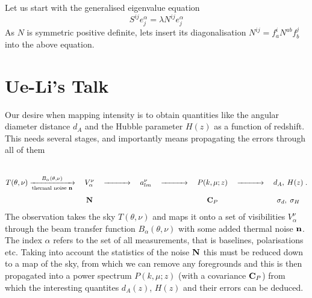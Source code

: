 \documentclass{revtex4}
\begin{document}
Let us start with the generalised eigenvalue equation
\begin{equation}
S^{ij} e_j^\alpha = \lambda N^{ij} e_j^\alpha
\end{equation}
As $N$ is symmetric positive definite, lets insert its diagonalisation $N^{ij} =
f^i_a N^{ab} f^j_b$ into the above equation.



\section{Ue-Li's Talk}

\newcommand{\vlrarrow}{\ensuremath{\xrightarrow{\qquad\quad}}}

Our desire when mapping \tcm{} intensity is to obtain quantities like the
angular diameter distance $d_A$ and the Hubble parameter $H(z)$ as a function of
redshift. This needs several stages, and importantly means propagating the
errors through all of them
\begin{equation}
  T(\theta, \nu) \xrightarrow[\text{thermal noise }\vn]{B_\alpha(\theta,\nu)} \quad \begin{matrix} \\ \\V_\alpha^\nu \\ \\ \mN\end{matrix} \quad
  \vlrarrow \quad a_{lm}^\nu  \quad \vlrarrow \quad \begin{matrix} \\ \\P(k, \mu; z) \\ \\ \mC_P \end{matrix}  \quad \vlrarrow \quad \begin{matrix} \\ \\  d_A,\: H(z)  \\ \\ \sigma_d, \; \sigma_H \end{matrix} \; .
\end{equation}
The observation takes the sky $T(\theta, \nu)$ and maps it onto a set of
visibilities $V_\alpha^\nu$ through the beam transfer function $B_\alpha(\theta,
\nu)$ with some added thermal noise $\mathbf{n}$. The index $\alpha$ refers to the set
of all measurements, that is baselines, polarisations etc. Taking into account
the statistics of the noise $\mathbf{N}$ this must be reduced down to a map of the sky,
from which we can remove any foregrounds and this is then propagated into a
power spectrum $P(k, \mu; z)$ (with a covariance $\mathbf{C}_P$) from which the
interesting quantites $d_A(z)$, $H(z)$ and their errors can be deduced.
\end{document}
